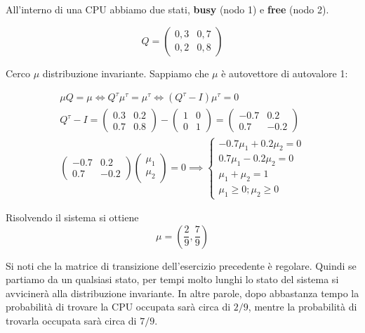 \begin{exmp}
	All'interno di una CPU abbiamo due stati, \textbf{busy} (nodo 1) e \textbf{free} (nodo 2).
	
	\begin{equation*}
	Q = \begin{pmatrix}
	0,3 & 0,7 \\
	0,2 & 0,8
	\end{pmatrix}
	\end{equation*}
	
	Cerco $ \mu $ distribuzione invariante. Sappiamo che $ \mu $ \`e  autovettore di autovalore 1:
	
	\begin{equation*}
	\begin{aligned}
	\mu Q = \mu \iff Q^\tau \mu^\tau  = \mu^\tau \iff (Q^\tau -I)\mu^\tau = 0 \\
	Q^\tau - I = \begin{pmatrix}
	0.3 & 0.2 \\
	0.7 & 0.8
	\end{pmatrix} - \begin{pmatrix}
	1 & 0 \\ 0 & 1
	\end{pmatrix} = \begin{pmatrix}
	-0.7 & 0.2 \\
	0.7 & -0.2
	\end{pmatrix} \\
	\begin{pmatrix}
	-0.7 & 0.2 \\
	0.7 & -0.2
	\end{pmatrix} \begin{pmatrix}
	\mu_1 \\ \mu_2
	\end{pmatrix} = 0 
	\implies \begin{cases}
	-0.7\mu_1 + 0.2 \mu_2 = 0 \\
	0.7\mu_1 - 0.2 \mu_2 = 0 \\
	\mu_1 + \mu_2 = 1\\
	\mu_1 \geq 0; \mu_2 \geq 0	

	\end{cases}
	\end{aligned}
	\end{equation*}
	
Risolvendo il sistema si ottiene
$$
	\mu=\left( \dfrac{2}{9},\dfrac{7}{9}\right)
$$	
\end{exmp}

Si noti che la matrice di transizione dell'esercizio precedente \`e regolare. 
Quindi se partiamo da un qualsiasi stato, per tempi molto lunghi lo stato del sistema si avviciner\`a alla distribuzione invariante.
In altre parole, dopo abbastanza tempo la probabilit\`a di trovare la CPU occupata sar\`a circa di $2/9$, mentre 
la probabilit\`a di trovarla  occupata sar\`a circa di $7/9$.

